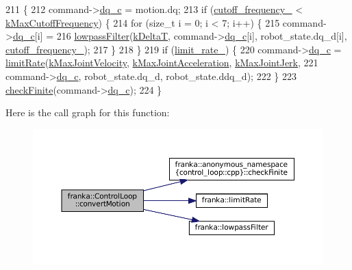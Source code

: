\begin{DoxyCode}
211                                                             \{
212   command->\hyperlink{structresearch__interface_1_1robot_1_1MotionGeneratorCommand_ab8de7c1bdd902fbf88b2d3637a958a54}{dq\_c} = motion.dq;
213   \textcolor{keywordflow}{if} (\hyperlink{classfranka_1_1ControlLoop_a1c01098536341d3e1da2617a08129529}{cutoff\_frequency\_} < \hyperlink{namespacefranka_adb10b364af8deb9e17d9bcc1ff2695be}{kMaxCutoffFrequency}) \{
214     \textcolor{keywordflow}{for} (\textcolor{keywordtype}{size\_t} i = 0; i < 7; i++) \{
215       command->\hyperlink{structresearch__interface_1_1robot_1_1MotionGeneratorCommand_ab8de7c1bdd902fbf88b2d3637a958a54}{dq\_c}[i] =
216           \hyperlink{namespacefranka_a94c21b0e87afce0147a9cd6025c239ca}{lowpassFilter}(\hyperlink{namespacefranka_a1e207a0d5a6e90c1e1a78e6e1057120a}{kDeltaT}, command->\hyperlink{structresearch__interface_1_1robot_1_1MotionGeneratorCommand_ab8de7c1bdd902fbf88b2d3637a958a54}{dq\_c}[i], robot\_state.dq\_d[i], 
      \hyperlink{classfranka_1_1ControlLoop_a1c01098536341d3e1da2617a08129529}{cutoff\_frequency\_});
217     \}
218   \}
219   \textcolor{keywordflow}{if} (\hyperlink{classfranka_1_1ControlLoop_a660f32d739c7f7ed05fa97b06220b98b}{limit\_rate\_}) \{
220     command->\hyperlink{structresearch__interface_1_1robot_1_1MotionGeneratorCommand_ab8de7c1bdd902fbf88b2d3637a958a54}{dq\_c} = \hyperlink{namespacefranka_a77e127a920da5b0ad29877ec3ff29f15}{limitRate}(\hyperlink{namespacefranka_a6d451800a90b939422dc9c3fb103ca23}{kMaxJointVelocity}, 
      \hyperlink{namespacefranka_a826ecf0b7d214df69c1ee416d3e66b93}{kMaxJointAcceleration}, \hyperlink{namespacefranka_a600a21a6151ff2eee38294293dd8aeec}{kMaxJointJerk},
221                               command->\hyperlink{structresearch__interface_1_1robot_1_1MotionGeneratorCommand_ab8de7c1bdd902fbf88b2d3637a958a54}{dq\_c}, robot\_state.dq\_d, robot\_state.ddq\_d);
222   \}
223   \hyperlink{namespacefranka_1_1anonymous__namespace_02control__loop_8cpp_03_af284e9c97573a00e6fc31f0c716d6add}{checkFinite}(command->\hyperlink{structresearch__interface_1_1robot_1_1MotionGeneratorCommand_ab8de7c1bdd902fbf88b2d3637a958a54}{dq\_c});
224 \}
\end{DoxyCode}
Here is the call graph for this function\+:
\nopagebreak
\begin{figure}[H]
\begin{center}
\leavevmode
\includegraphics[width=350pt]{classfranka_1_1ControlLoop_a64b502db834f429b6869c09bd1afd2fb_cgraph}
\end{center}
\end{figure}
